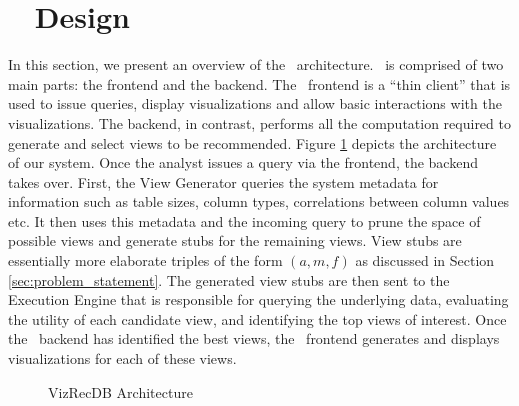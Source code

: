 

\section{{\large \VizRecDB\ } Design}
\label{sec:system_architecture}

In this section, we present an overview of the \VizRecDB\ architecture.
\VizRecDB\ is comprised of two main parts: the frontend and the backend. 
The \VizRecDB\ frontend is a ``thin client''
that is used to issue queries, display visualizations and allow basic interactions
with the visualizations. 
The backend, in contrast, performs all the computation required to generate and select views
to be recommended. 
Figure \ref{fig:sys-arch} depicts the architecture of our system.
Once the analyst issues a query via the frontend, the backend takes over.
First, the View Generator queries the system metadata for information such as
table sizes, column types, correlations between column values etc. 
It then uses this metadata and the incoming query to prune the space
of possible views and generate stubs for the remaining views. 
View stubs are essentially more elaborate triples of the form $(a, m, f)$ as
discussed in Section \ref{sec:problem_statement}. 
The generated view stubs are then sent to the Execution Engine that is
responsible for querying the underlying data, evaluating the utility of each
candidate view, and identifying the top views of interest. 
Once the \VizRecDB\ backend has identified the best views, the \VizRecDB\
frontend generates and displays visualizations for each of these views. 

\begin{figure}[htb]
\vspace{-10pt}
\centerline{
\hbox{}}
\vspace{-15pt}
\caption{VizRecDB Architecture}
\label{fig:sys-arch}
\vspace{-15pt}
\end{figure} 

